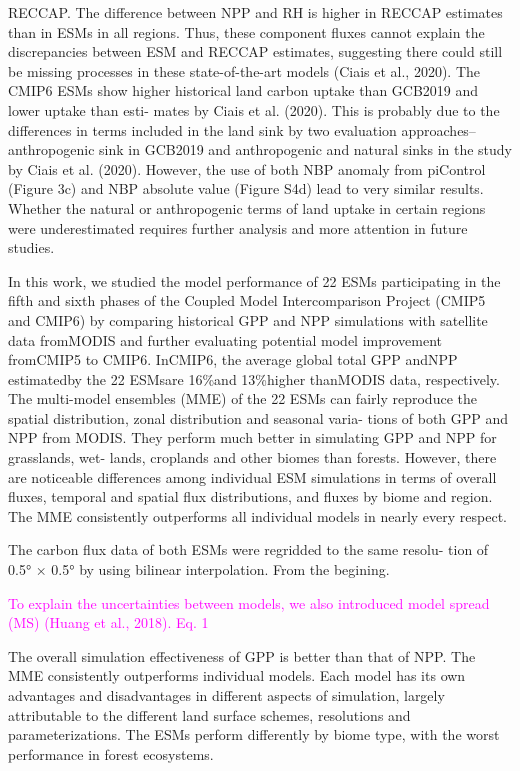 \documentclass{article}
\begin{document}
RECCAP. The difference between NPP and RH is higher in RECCAP estimates than in ESMs in all regions. Thus, these component fluxes cannot explain the discrepancies between ESM and RECCAP estimates, suggesting there could still be missing processes in these state-of-the-art models (Ciais et al., 2020).
The CMIP6 ESMs show higher historical land carbon uptake than GCB2019 and lower uptake than esti- mates by Ciais et al. (2020). This is probably due to the differences in terms included in the land sink by two evaluation approaches–anthropogenic sink in GCB2019 and anthropogenic and natural sinks in the study by Ciais et al. (2020). However, the use of both NBP anomaly from piControl (Figure 3c) and NBP absolute value (Figure S4d) lead to very similar results. Whether the natural or anthropogenic terms of land uptake in certain regions were underestimated requires further analysis and more attention in future studies.

\citet{Hu2022}
In this work, we studied the model performance of 22 ESMs participating in the fifth and sixth phases of the Coupled Model Intercomparison Project (CMIP5 and CMIP6) by comparing historical GPP and NPP simulations with satellite data fromMODIS and further evaluating potential model improvement fromCMIP5 to CMIP6.
InCMIP6, the average global total GPP andNPP estimatedby the 22 ESMsare 16\%and 13\%higher thanMODIS data, respectively. The multi-model ensembles (MME) of the 22 ESMs can fairly reproduce the spatial distribution, zonal distribution and seasonal varia- tions of both GPP and NPP from MODIS. They perform much better in simulating GPP and NPP for grasslands, wet- lands, croplands and other biomes than forests. However, there are noticeable differences among individual ESM simulations in terms of overall fluxes, temporal and spatial flux distributions, and fluxes by biome and region. The MME consistently outperforms all individual models in nearly every respect.

The carbon flux data of both ESMs were regridded to the same resolu-
tion of 0.5° × 0.5° by using bilinear interpolation. From the begining.

\textcolor{magenta}{To explain the uncertainties between models, we also introduced model spread (MS) (Huang et al., 2018). Eq. 1}

The overall simulation effectiveness of GPP is better than that of NPP. The MME consistently outperforms individual models. Each model has its own advantages and disadvantages in different aspects of simulation, largely attributable to the different land surface schemes, resolutions and parameterizations. The ESMs perform differently by biome type, with the worst performance in forest ecosystems.
\end{document}

